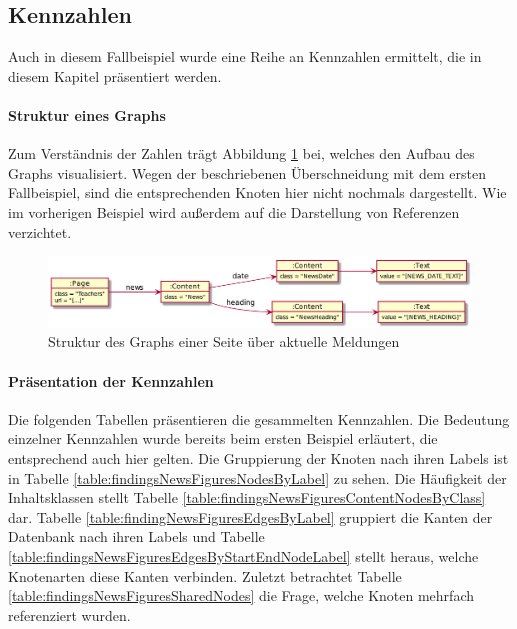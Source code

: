 \subsection{Kennzahlen}
    Auch in diesem Fallbeispiel wurde eine Reihe an Kennzahlen ermittelt,
    die in diesem Kapitel präsentiert werden.

    \paragraph{Struktur eines Graphs}
    Zum Verständnis der Zahlen trägt Abbildung \ref{image:findingNewsFiguresDbModel} bei,
    welches den Aufbau des Graphs visualisiert.
    Wegen der beschriebenen Überschneidung mit dem ersten Fallbeispiel,
    sind die entsprechenden Knoten hier nicht nochmals dargestellt.
    Wie im vorherigen Beispiel wird außerdem auf die Darstellung von
    Referenzen verzichtet.

    \begin{figure}[htb]
        \centering
        \includegraphics[scale=\imageScalingFactor]{../resources/findings/case-study-2/dbmodel.png}
        \caption{Struktur des Graphs einer Seite über aktuelle Meldungen}
        \label{image:findingNewsFiguresDbModel}
    \end{figure}

    \paragraph{Präsentation der Kennzahlen}
    Die folgenden Tabellen präsentieren die gesammelten Kennzahlen.
    Die Bedeutung einzelner Kennzahlen wurde bereits beim ersten Beispiel erläutert,
    die entsprechend auch hier gelten.
    Die Gruppierung der Knoten nach ihren Labels ist in Tabelle
    \ref{table:findingsNewsFiguresNodesByLabel} zu sehen.
    Die Häufigkeit der Inhaltsklassen stellt Tabelle
    \ref{table:findingsNewsFiguresContentNodesByClass} dar.
    Tabelle \ref{table:findingNewsFiguresEdgesByLabel} gruppiert die Kanten der Datenbank
    nach ihren Labels und Tabelle
    \ref{table:findingsNewsFiguresEdgesByStartEndNodeLabel}
    stellt heraus, welche Knotenarten diese Kanten verbinden.
    Zuletzt betrachtet Tabelle \ref{table:findingsNewsFiguresSharedNodes}
    die Frage, welche Knoten mehrfach referenziert wurden.

